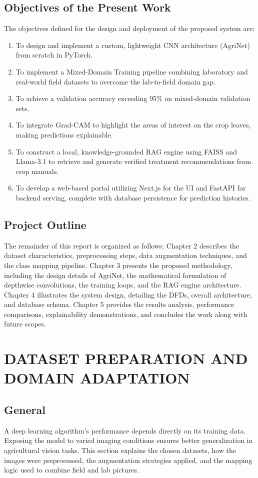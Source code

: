 \documentclass[12pt, a4paper]{report}
\begin{document}
\section{Objectives of the Present Work}
The objectives defined for the design and deployment of the proposed system are:
\begin{enumerate}
    \item To design and implement a custom, lightweight CNN architecture (AgriNet) from scratch in PyTorch.
    \item To implement a Mixed-Domain Training pipeline combining laboratory and real-world field datasets to overcome the lab-to-field domain gap.
    \item To achieve a validation accuracy exceeding 95\% on mixed-domain validation sets.
    \item To integrate Grad-CAM to highlight the areas of interest on the crop leaves, making predictions explainable.
    \item To construct a local, knowledge-grounded RAG engine using FAISS and Llama-3.1 to retrieve and generate verified treatment recommendations from crop manuals.
    \item To develop a web-based portal utilizing Next.js for the UI and FastAPI for backend serving, complete with database persistence for prediction histories.
\end{enumerate}

\section{Project Outline}
The remainder of this report is organized as follows: Chapter 2 describes the dataset characteristics, preprocessing steps, data augmentation techniques, and the class mapping pipeline. Chapter 3 presents the proposed methodology, including the design details of AgriNet, the mathematical formulation of depthwise convolutions, the training loops, and the RAG engine architecture. Chapter 4 illustrates the system design, detailing the DFDs, overall architecture, and database schema. Chapter 5 provides the results analysis, performance comparisons, explainability demonstrations, and concludes the work along with future scopes.

\chapter{DATASET PREPARATION AND DOMAIN ADAPTATION}

\section{General}
A deep learning algorithm's performance depends directly on its training data. Exposing the model to varied imaging conditions ensures better generalization in agricultural vision tasks. This section explains the chosen datasets, how the images were preprocessed, the augmentation strategies applied, and the mapping logic used to combine field and lab pictures.
\end{document}
